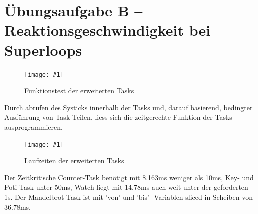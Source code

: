\documentclass{article}
\newcommand{\bild}[3]{\begin{figure}[h!]		\begin{center}			\texttt{[image: \#1]}			\caption{#2}		\end{center}	\end{figure}}
\begin{document}
\section{Übungsaufgabe B – Reaktionsgeschwindigkeit bei Superloops}
\bild{RTO1_UE1_APUS}{Funktionstest der erweiterten Tasks}{width=0.8\textwidth}
Durch abrufen des Systicks innerhalb der Tasks und, darauf basierend, bedingter Ausführung von Task-Teilen, liess sich die zeitgerechte Funktion der Tasks ausprogrammieren.
\bild{04_TeilB}{Laufzeiten der erweiterten Tasks}{width=\textwidth}
Der Zeitkritische Counter-Task benötigt mit 8.163ms weniger als 10ms, Key- und Poti-Task unter 50ms, Watch liegt mit 14.78ms auch weit unter der geforderten 1s. Der Mandelbrot-Task ist mit 'von' und 'bis' -Variablen sliced in Scheiben von 36.78ms.
\end{document}
